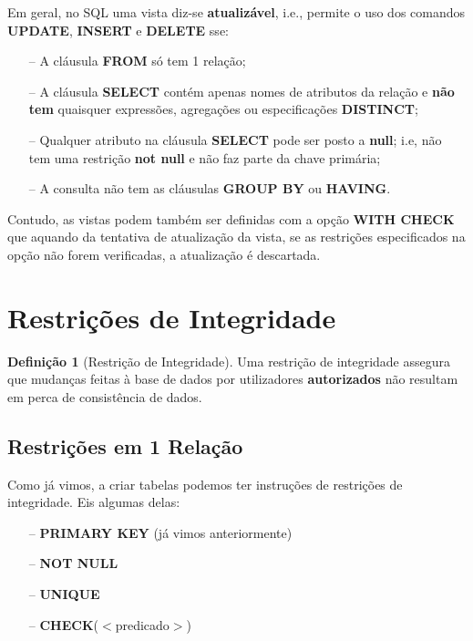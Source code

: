 \documentclass[oneside]{book}
\theoremstyle{definition}
\newtheorem{definition}{Definição}
\begin{document}
Em geral, no SQL uma vista diz-se \textbf{atualizável}, i.e., permite o uso dos comandos \textbf{UPDATE}, \textbf{INSERT} e \textbf{DELETE} sse:
\begin{itemize}
    \itemsep0cm
    \item[--] A cláusula \textbf{FROM} só tem 1 relação;
    \item[--] A cláusula \textbf{SELECT} contém apenas nomes de atributos da relação e \textbf{não tem} quaisquer expressões, agregações ou especificações \textbf{DISTINCT};
    \item[--] Qualquer atributo na cláusula \textbf{SELECT} pode ser posto a \textbf{null}; i.e, não tem uma restrição \textbf{not null} e não faz parte da chave primária;
    \item[--] A consulta não tem as cláusulas \textbf{GROUP BY} ou \textbf{HAVING}.
\end{itemize}

Contudo, as vistas podem também ser definidas com a opção \textbf{WITH CHECK} que aquando da tentativa de atualização da vista, se as restrições especificados na opção não forem verificadas, a atualização é descartada.

\section{Restrições de Integridade}
\begin{definition}[Restrição de Integridade]
    Uma restrição de integridade assegura que mudanças feitas à base de dados por utilizadores \textbf{autorizados} não resultam em perca de consistência de dados.
\end{definition}

\subsection{Restrições em 1 Relação}
Como já vimos, a criar tabelas podemos ter instruções de restrições de integridade. Eis algumas delas:
\begin{itemize}
    \itemsep0cm
    \item[--] \textbf{PRIMARY KEY} (já vimos anteriormente)
    \item[--] \textbf{NOT NULL}
    \item[--] \textbf{UNIQUE}
    \item[--] \textbf{CHECK}($<$predicado$>$)
\end{itemize}
\end{document}
